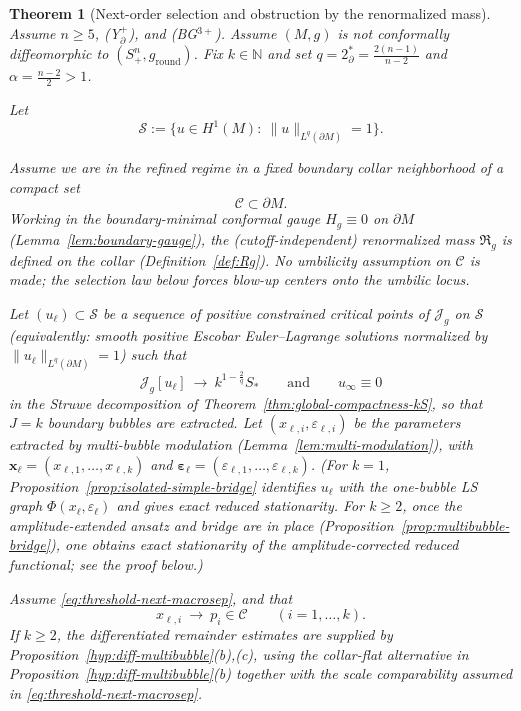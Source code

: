 \documentclass[11pt,reqno,a4paper]{amsart}
\numberwithin{equation}{section}
\theoremstyle{plain}
\newtheorem{theorem}{Theorem}[section]
\theoremstyle{remark}
\theoremstyle{plain}
\begin{document}
\begin{theorem}[Next-order selection and obstruction by the renormalized mass]\label{thm:threshold-next}
Assume $n\ge5$, \textup{(Y$^+_{\partial}$)}, and \textup{(BG$^{3+}$)}.
Assume $(M,g)$ is not conformally diffeomorphic to $(S^n_+,g_{\mathrm{round}})$.
Fix $k\in\mathbb N$ and set $q=2^*_{\partial}=\frac{2(n-1)}{n-2}$ and $\alpha=\frac{n-2}{2}>1$.

Let
\[
\mathcal S:=\Big\{u\in H^1(M):\ \|u\|_{L^q(\partial M)}=1\Big\}.
\]

\smallskip
Assume we are in the \emph{refined regime} in a fixed boundary collar neighborhood of a compact set
\[
\mathcal C\subset \partial M.
\]
Working in the boundary-minimal conformal gauge $H_g\equiv0$ on $\partial M$
(Lemma~\ref{lem:boundary-gauge}), the (cutoff-independent) renormalized mass $\mathfrak R_g$ is defined on the collar
(Definition~\ref{def:Rg}).
No umbilicity assumption on $\mathcal C$ is made; the selection law below
forces blow-up centers onto the umbilic locus.

Let $(u_\ell)\subset\mathcal S$ be a sequence of \emph{positive constrained critical points} of $\mathcal J_g$ on $\mathcal S$
(equivalently: smooth positive Escobar Euler--Lagrange solutions normalized by $\|u_\ell\|_{L^q(\partial M)}=1$) such that
\[
\mathcal J_g[u_\ell]\ \longrightarrow\ k^{1-\frac{2}{q}}S_\ast
\qquad\text{and}\qquad u_\infty\equiv0
\]
in the Struwe decomposition of Theorem~\ref{thm:global-compactness-kS}, so that $J=k$ boundary bubbles are extracted.
Let $(x_{\ell,i},\varepsilon_{\ell,i})$ be the parameters extracted by multi-bubble modulation
(Lemma~\ref{lem:multi-modulation}), with
$\mathbf x_\ell=(x_{\ell,1},\dots,x_{\ell,k})$ and $\boldsymbol\varepsilon_\ell=(\varepsilon_{\ell,1},\dots,\varepsilon_{\ell,k})$.
(For $k=1$, Proposition~\ref{prop:isolated-simple-bridge} identifies $u_\ell$ with
the one-bubble LS graph $\Phi(x_\ell,\varepsilon_\ell)$ and gives exact reduced stationarity.
For $k\ge2$, once the amplitude-extended ansatz and bridge are in place
(Proposition~\ref{prop:multibubble-bridge}),
one obtains exact stationarity of the
amplitude-corrected reduced functional; see the proof below.)

Assume \eqref{eq:threshold-next-macrosep}, and that
\[
x_{\ell,i}\ \longrightarrow\ p_i\in\mathcal C\qquad(i=1,\dots,k).
\]
If $k\ge2$, the differentiated remainder estimates are supplied by
Proposition~\ref{hyp:diff-multibubble}\textup{(b),(c)}, using the collar-flat alternative in
Proposition~\ref{hyp:diff-multibubble}\textup{(b)} together with the scale comparability assumed in
\eqref{eq:threshold-next-macrosep}.


\end{theorem}
\end{document}
